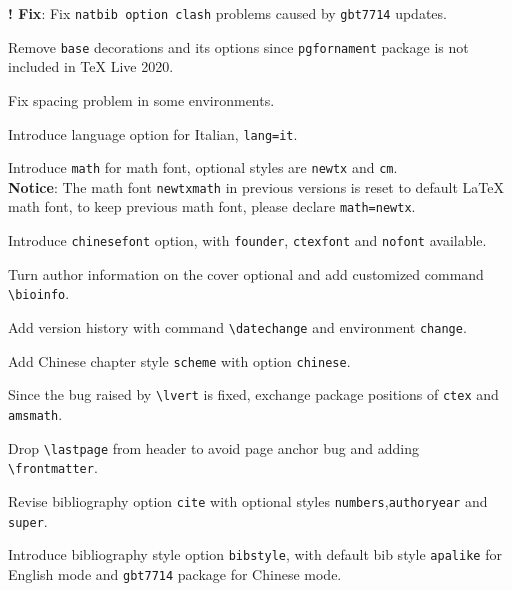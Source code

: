 

\begin{change}
  \item \textbf{! Fix}: Fix \lstinline{natbib option clash} problems caused by \lstinline{gbt7714} updates.
  \item Remove \lstinline{base} decorations and its options since \lstinline{pgfornament} package is not included in \TeX{} Live 2020.
  \item Fix spacing problem in some environments.
  \item Introduce language option for Italian, \lstinline{lang=it}.
\end{change}



\begin{change}
  \item Introduce \lstinline{math} for math font, optional styles are \lstinline{newtx} and \lstinline{cm}.\\
  \textbf{Notice}: The math font \lstinline{newtxmath} in previous versions is reset to default \LaTeX{} math font, to keep previous math font, please declare \lstinline{math=newtx}.
  \item Introduce \lstinline{chinesefont} option, with \lstinline{founder}, \lstinline{ctexfont} and \lstinline{nofont} available.
  \item Turn author information on the cover optional and add customized command \lstinline{\bioinfo}.
  \item Add version history with command \lstinline{\datechange} and environment \lstinline{change}.
  \item Add Chinese chapter style \lstinline{scheme} with option \lstinline{chinese}.
  \item Since the bug raised by \lstinline{\lvert} is fixed, exchange package positions of \lstinline{ctex} and \lstinline{amsmath}.
  \item Drop \lstinline{\lastpage} from header to avoid page anchor bug and adding \lstinline{\frontmatter}.
  \item Revise bibliography option \lstinline{cite} with optional styles \lstinline{numbers},\lstinline{authoryear} and \lstinline{super}.
  \item Introduce bibliography style option \lstinline{bibstyle}, with default bib style \lstinline{apalike} for English mode and \lstinline{gbt7714} package for Chinese mode.
\end{change}

